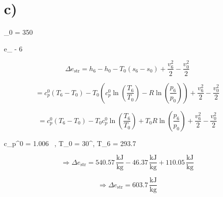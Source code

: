 

\section*{c)}
 \quad {}_0 = 350 \, 

 \quad \Delta e_{} \quad {}  - 6 \quad \Rightarrow {}

\[
\Delta e_{\text{str}} = h_6 - h_0 - T_0 (s_6 - s_0) + \frac{v_6^2}{2} - \frac{v_0^2}{2}
\]

\[
= c_p^0 (T_6 - T_0) - T_0 \left( c_p^0 \ln \left( \frac{T_6}{T_0} \right) - R \ln \left( \frac{p_6}{p_0} \right) \right) + \frac{v_6^2}{2} - \frac{v_0^2}{2}
\]

\[
= c_p^0 (T_6 - T_0) - T_0 c_p^0 \ln \left( \frac{T_6}{T_0} \right) + T_0 R \ln \left( \frac{p_6}{p_0} \right) + \frac{v_6^2}{2} - \frac{v_0^2}{2}
\]

 \quad c_p^0 = 1.006 \, , \quad T_0 = 30^\circ {}, \quad T_6 = 293.7 \, 

\[
\Rightarrow \Delta e_{\text{str}} = 540.57 \, \frac{\text{kJ}}{\text{kg}} - 46.37 \, \frac{\text{kJ}}{\text{kg}} + 110.05 \, \frac{\text{kJ}}{\text{kg}}
\]

\[
\Rightarrow \Delta e_{\text{str}} = 603.7 \, \frac{\text{kJ}}{\text{kg}}
\]